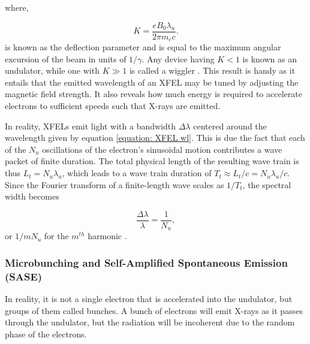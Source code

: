 \documentclass[aps,prb,twocolumn,superscriptaddress]{revtex4-2}
\begin{document}
where,

\begin{equation}
    K = \frac{eB_0\lambda_u}{2\pi m_e c}.
\end{equation}
is known as the deflection parameter and is equal to the maximum angular
excursion of the beam in units of $1/\gamma$. Any device having $K < 1$ is
known as an undulator, while one with $K \gg 1$ is called a wiggler
\cite{CERN}. This result is handy as it
entails that the emitted wavelength of an XFEL may be tuned by adjusting the
magnetic field strength. It also reveals how much 
energy is required to accelerate electrons to sufficient speeds such that 
X-rays are emitted. 
    
    In reality, XFELs emit light with a bandwidth $\Delta\lambda$ centered
around the wavelength given by equation \ref{equation: XFEL wl}. This is due
the fact that each of the $N_u$ oscillations of the electron's sinusoidal motion 
contributes a wave packet of finite duration. The total physical length of the
resulting wave train is thus $L_t = N_u\lambda_u$, which leads to a wave train
duration of $T_t \approx L_t/c = N_u\lambda_u/c$. Since the Fourier transform 
of a finite-length wave scales as $1/T_t$, the spectral width becomes

\begin{equation}
    \frac{\Delta\lambda}{\lambda} = \frac{1}{N_u},
\end{equation}
or $1/mN_u$ for the $m^{th}$ harmonic \cite{CERN}.

\subsubsection{Microbunching and Self-Amplified Spontaneous Emission (SASE)}

In reality, it is not a single electron that is accelerated into the undulator,
but groups of them called bunches. A bunch of electrons will emit X-rays as it
passes through the undulator, but the radiation will be incoherent due to the
random phase of the electrons. 
\end{document}
